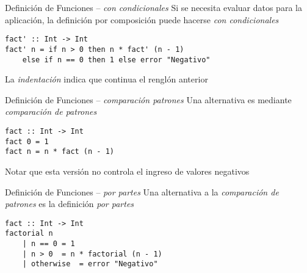 \begin{frame}[fragile]{Definición de Funciones -- \emph{con condicionales}}
    Si se necesita evaluar datos para la aplicación, la definición por composición puede hacerse \emph{con condicionales}
    \begin{lstlisting}[style=consola]
fact' :: Int -> Int
fact' n = if n > 0 then n * fact' (n - 1)
    else if n == 0 then 1 else error "Negativo"
    \end{lstlisting}
    La \emph{indentación} indica que continua el renglón anterior
\end{frame}

\begin{frame}[fragile]{Definición de Funciones -- \emph{comparación patrones}}
    Una alternativa es mediante \emph{comparación de patrones}
    \begin{lstlisting}[style=consola]
fact :: Int -> Int
fact 0 = 1
fact n = n * fact (n - 1)
    \end{lstlisting}
    Notar que esta versión no controla el ingreso de valores negativos
\end{frame}

\begin{frame}[fragile]{Definición de Funciones -- \emph{por partes}}
    Una alternativa a la \emph{comparación de patrones} es la definición \emph{por partes}
    \begin{lstlisting}[style=consola]
fact :: Int -> Int
factorial n
    | n == 0 = 1
    | n > 0  = n * factorial (n - 1)
    | otherwise  = error "Negativo"
    \end{lstlisting}
\end{frame}
